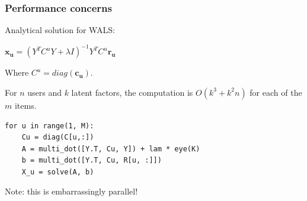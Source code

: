 \documentclass[xcolor = {table}]{beamer}
\begin{document}
  \begin{frame}[fragile]\label{math}
    \frametitle{Performance concerns}

    Analytical solution for WALS:


    \begin{center}
      $\mathbf{x_u} = (Y^TC^uY + \lambda I)^{-1}Y^TC^u\mathbf{r_u}$
      \quad
      \hyperlink{math.aux}{}
    \end{center}

    Where $C^u = diag(\mathbf{c_u})$.\\
     
    \vspace{1em}

    For $n$ users and $k$ latent factors, the computation is $O(k^3 + k^2n)$ for each of the $m$ items.

    \vspace{1em}

    \pause

    \begin{lstlisting}
for u in range(1, M):
    Cu = diag(C[u,:])
    A = multi_dot([Y.T, Cu, Y]) + lam * eye(K)
    b = multi_dot([Y.T, Cu, R[u, :]])
    X_u = solve(A, b)
    \end{lstlisting}

    Note: this is embarrassingly parallel!

  \end{frame}
\end{document}
